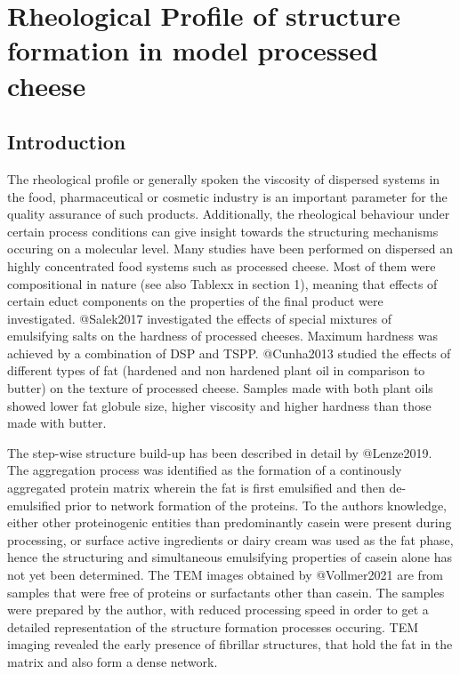 \documentclass[
]{article}
\author{}
\date{\vspace{-2.5em}}
\begin{document}
\section{Rheological Profile of structure formation in model processed cheese}
\subsection{Introduction}

The rheological profile or generally spoken the viscosity of dispersed
systems in the food, pharmaceutical or cosmetic industry is an important
parameter for the quality assurance of such products. Additionally, the
rheological behaviour under certain process conditions can give insight
towards the structuring mechanisms occuring on a molecular level. Many
studies have been performed on dispersed an highly concentrated food
systems such as processed cheese. Most of them were compositional in
nature (see also Tablexx in section 1), meaning that effects of certain
educt components on the properties of the final product were
investigated. @Salek2017 investigated the effects of special mixtures of
emulsifying salts on the hardness of processed cheeses. Maximum hardness
was achieved by a combination of DSP and TSPP. @Cunha2013 studied the
effects of different types of fat (hardened and non hardened plant oil
in comparison to butter) on the texture of processed cheese. Samples
made with both plant oils showed lower fat globule size, higher
viscosity and higher hardness than those made with butter.

The step-wise structure build-up has been described in detail by
@Lenze2019. The aggregation process was identified as the formation of a
continously aggregated protein matrix wherein the fat is first
emulsified and then de-emulsified prior to network formation of the
proteins. To the authors knowledge, either other proteinogenic entities
than predominantly casein were present during processing, or surface
active ingredients or dairy cream was used as the fat phase, hence the
structuring and simultaneous emulsifying properties of casein alone has
not yet been determined. The TEM images obtained by @Vollmer2021 are
from samples that were free of proteins or surfactants other than
casein. The samples were prepared by the author, with reduced processing
speed in order to get a detailed representation of the structure
formation processes occuring. TEM imaging revealed the early presence of
fibrillar structures, that hold the fat in the matrix and also form a
dense network.
\end{document}
